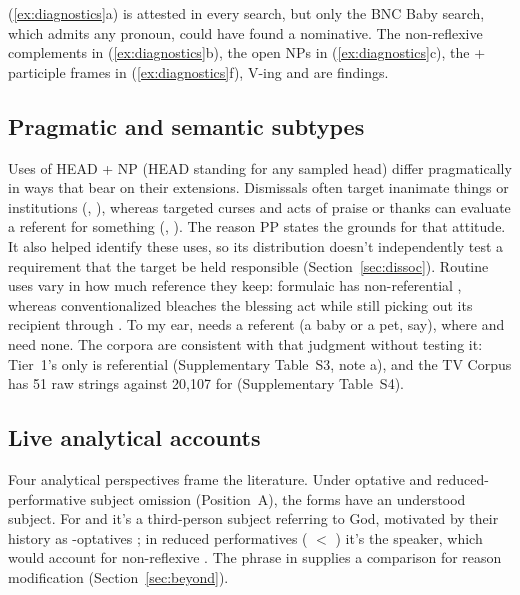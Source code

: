 \documentclass[12pt]{article}
\begin{document}
(\ref{ex:diagnostics}a) is attested in every search, but only the BNC Baby search, which admits any pronoun, could have found a nominative. The non-reflexive complements in (\ref{ex:diagnostics}b), the open NPs in (\ref{ex:diagnostics}c), the  + participle frames in (\ref{ex:diagnostics}f),  V-ing and  are findings.

\subsection{Pragmatic and semantic subtypes}
\label{sec:subtypes}

Uses of HEAD + NP (HEAD standing for any sampled head) differ pragmatically in ways that bear on their extensions. Dismissals often target inanimate things or institutions (, ), whereas targeted curses and acts of praise or thanks can evaluate a referent for something (, ). The reason PP states the grounds for that attitude. It also helped identify these uses, so its distribution doesn't independently test a requirement that the target be held responsible (Section~\ref{sec:dissoc}). Routine uses vary in how much reference they keep: formulaic  has non-referential , whereas conventionalized  bleaches the blessing act while still picking out its recipient through . To my ear,  needs a referent (a baby or a pet, say), where  and  need none. The corpora are consistent with that judgment without testing it: Tier~1's only  is referential (Supplementary Table~S3, note a), and the TV Corpus has 51 raw  strings against 20,107 for  (Supplementary Table~S4).

\subsection{Live analytical accounts}
\label{sec:four-positions}

Four analytical perspectives frame the literature. Under optative and reduced-performative subject omission (Position~A), the forms have an understood subject. For  and  it's a third-person subject referring to God, motivated by their history as -optatives \citep{huddleston2002,ljung2011}; in reduced performatives ( $<$ ) it's the speaker, which would account for non-reflexive . The  phrase in  supplies a comparison for reason modification (Section~\ref{sec:beyond}).
\end{document}
